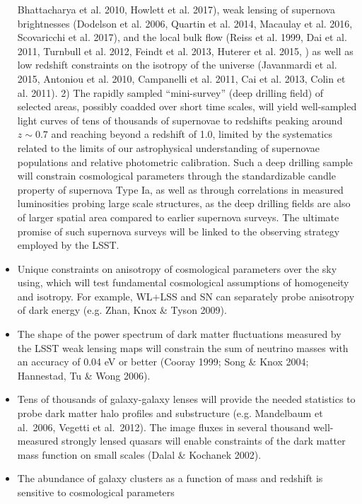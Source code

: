 \begin{itemize}
Bhattacharya et al. 2010, Howlett et al. 2017), weak lensing of supernova brightnesses (Dodelson et al. 2006, 
Quartin et al. 2014, Macaulay et al. 2016, Scovaricchi et al. 2017), and the local bulk flow (Reiss et al. 1999, 
Dai et al. 2011, Turnbull et al. 2012, Feindt et al. 2013,  Huterer et al. 2015, ) as well as  
low redshift constraints on the isotropy of the universe (Javanmardi et al. 2015, Antoniou et al. 2010, 
Campanelli et al. 2011, Cai et al. 2013, Colin et al. 2011).  2) The rapidly sampled ``mini-survey'' 
(deep drilling field) of selected areas, possibly coadded over short time scales,  will yield well-sampled 
light curves of tens of thousands of supernovae to redshifts peaking around $z\sim 0.7$ and reaching beyond a 
redshift of 1.0, limited by the systematics related to the limits of our astrophysical understanding of supernovae 
populations and relative photometric calibration. Such a deep drilling sample will constrain cosmological parameters 
through the standardizable candle property of supernova Type Ia, as well as through correlations in measured 
luminosities probing large scale structures, as the deep drilling fields are also of larger spatial area compared 
to earlier supernova surveys. The ultimate promise of such supernova surveys will be linked to the observing strategy employed by the LSST.
\item Unique constraints on anisotropy of cosmological parameters over the sky using, which will test fundamental cosmological 
assumptions of homogeneity and isotropy.
For example, WL$+$LSS and SN can separately probe anisotropy of dark energy (e.g. Zhan, Knox \& Tyson 2009).
\item The shape of the power spectrum of dark matter fluctuations measured by
the LSST weak lensing maps will constrain the sum of neutrino masses with an accuracy
of 0.04 eV or better (Cooray 1999; Song \& Knox 2004; Hannestad, Tu \& Wong 2006).
\item Tens of thousands of galaxy-galaxy lenses will provide the needed statistics to probe dark matter
halo profiles and substructure (e.g. Mandelbaum et al.~2006, Vegetti et al.~2012). The image fluxes in several thousand well-measured
strongly lensed quasars will enable constraints of the dark matter mass function on small scales (Dalal \& Kochanek 2002).
\item The abundance of galaxy clusters as a function of mass and redshift is sensitive to cosmological parameters

\end{itemize}
